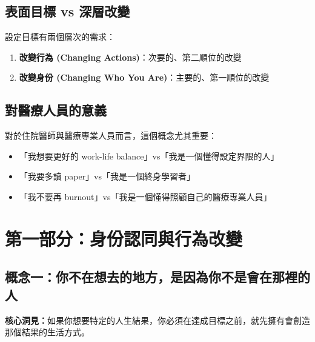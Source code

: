 \documentclass[12pt,a4paper]{article}
\begin{document}
\subsection{表面目標 vs 深層改變}

設定目標有兩個層次的需求：

\begin{enumerate}
    \item \textbf{改變行為 (Changing Actions)}：次要的、第二順位的改變
    \item \textbf{改變身份 (Changing Who You Are)}：主要的、第一順位的改變
\end{enumerate}


\subsection{對醫療人員的意義}

對於住院醫師與醫療專業人員而言，這個概念尤其重要：

\begin{itemize}
    \item 「我想要更好的 work-life balance」vs「我是一個懂得設定界限的人」
    \item 「我要多讀 paper」vs「我是一個終身學習者」
    \item 「我不要再 burnout」vs「我是一個懂得照顧自己的醫療專業人員」
\end{itemize}

\section{第一部分：身份認同與行為改變}

\subsection{概念一：你不在想去的地方，是因為你不是會在那裡的人}

\begin{importantbox}
\textbf{核心洞見：}如果你想要特定的人生結果，你必須在達成目標之前，就先擁有會創造那個結果的生活方式。
\end{importantbox}
\end{document}
